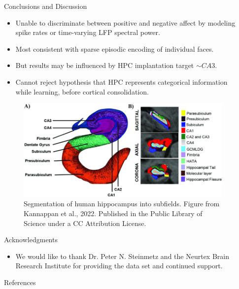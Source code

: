 \documentclass[final,20pt]{beamer}
\newlength{\sepwidth}
\newlength{\colwidth}
\newlength{\colwidthsmall}
\newcommand{\separatorcolumn}{\begin{column}{\sepwidth}\end{column}}
\begin{document}
\begin{frame}[t]
\begin{columns}[t]
\begin{column}{\colwidthsmall}
\begin{block}{Conclusions and Discussion}
    \begin{itemize}
        \item Unable to discriminate between positive and negative affect by modeling spike rates or time-varying LFP spectral power.
        \item Most consistent with sparse episodic encoding of individual faces.
        \item But results may be influenced by HPC implantation target $\sim CA3$.
        \item Cannot reject hypothesis that HPC represents categorical information while learning, before cortical consolidation.  
    \end{itemize}
    \begin{figure}
    \centering
    \includegraphics[width=.9\textwidth]{figures/Hippocampus subfields 3.png}
    \caption{Segmentation of human hippocampus into subfields.  Figure from Kannappan et al., 2022. \cite{kannappan_polygenic_2022} Published in the Public Library of Science under a CC Attribution License.  
    }
    \end{figure}
    

  \end{block}
  
  \begin{block}{Acknowledgments}
    
    \begin{itemize}
      \item We would like to thank Dr. Peter N. Steinmetz and the Neurtex Brain Research Institute for providing the data set and continued support.
    \end{itemize}
 
  \end{block}

  \begin{block}{References}

    \footnotesize{}

  \end{block}
  

\end{column}

\separatorcolumn
\end{columns}
\end{frame}
\end{document}

